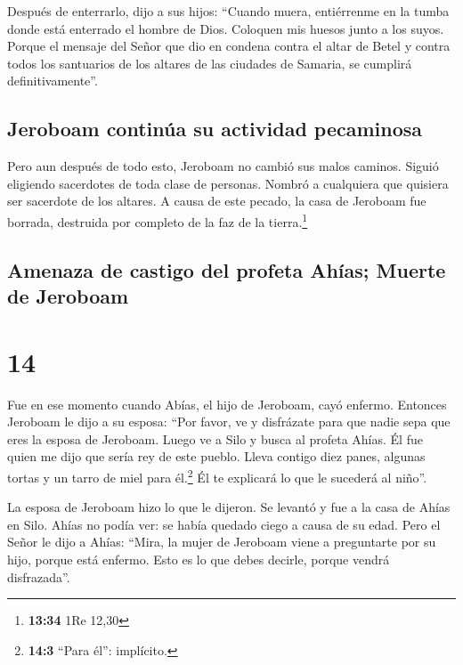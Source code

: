  Después de enterrarlo, dijo a sus hijos: ``Cuando muera,
entiérrenme en la tumba donde está enterrado el hombre de Dios. Coloquen
mis huesos junto a los suyos.  Porque el mensaje del
Señor que dio en condena contra el altar de Betel y contra todos los
santuarios de los altares de las ciudades de Samaria, se cumplirá
definitivamente''.

\hypertarget{jeroboam-continuxfaa-su-actividad-pecaminosa}{%
\subsection{Jeroboam continúa su actividad
pecaminosa}\label{jeroboam-continuxfaa-su-actividad-pecaminosa}}

 Pero aun después de todo esto, Jeroboam no cambió sus
malos caminos. Siguió eligiendo sacerdotes de toda clase de personas.
Nombró a cualquiera que quisiera ser sacerdote de los altares.
 A causa de este pecado, la casa de Jeroboam fue borrada,
destruida por completo de la faz de la tierra.\footnote{\textbf{13:34}
  1Re 12,30}

\hypertarget{amenaza-de-castigo-del-profeta-ahuxedas-muerte-de-jeroboam}{%
\subsection{Amenaza de castigo del profeta Ahías; Muerte de
Jeroboam}\label{amenaza-de-castigo-del-profeta-ahuxedas-muerte-de-jeroboam}}

\hypertarget{section-13}{%
\section{14}\label{section-13}}

 Fue en ese momento cuando Abías, el hijo de Jeroboam,
cayó enfermo.  Entonces Jeroboam le dijo a su esposa:
``Por favor, ve y disfrázate para que nadie sepa que eres la esposa de
Jeroboam. Luego ve a Silo y busca al profeta Ahías. Él fue quien me dijo
que sería rey de este pueblo.  Lleva contigo diez panes,
algunas tortas y un tarro de miel para él.\footnote{\textbf{14:3} ``Para
  él'': implícito.} Él te explicará lo que le sucederá al niño''.

 La esposa de Jeroboam hizo lo que le dijeron. Se levantó
y fue a la casa de Ahías en Silo. Ahías no podía ver: se había quedado
ciego a causa de su edad.  Pero el Señor le dijo a Ahías:
``Mira, la mujer de Jeroboam viene a preguntarte por su hijo, porque
está enfermo. Esto es lo que debes decirle, porque vendrá disfrazada''.

